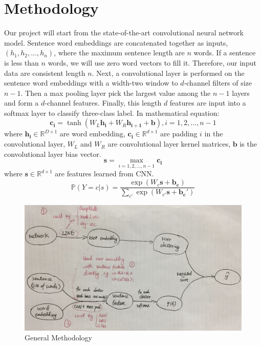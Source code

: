 \newcommand{\R}{\mathbb{R}}
\section{Methodology}
\label{Sec:methodology}


Our project will start from the state-of-the-art convolutional neural network model. Sentence word embeddings are concatenated together as inputs, $(h_1,h_2,\ldots,h_n)$, where the maximum sentence length are $n$ words. If a sentence is less than $n$ words, we will use zero word vectors to fill it. Therefore, our input data are consistent length $n$. Next, a convolutional layer is performed on the sentence word embeddings with a width-two window to $d$-channel filters of size $n-1$. Then a max pooling layer pick the largest value among the $n-1$ layers and form a $d$-channel features. Finally, this length $d$ features are input into a softmax layer to classify three-class label. In mathematical equation:
\begin{equation}
	\mathbf{c_i} = \tanh(W_L\mathbf{h_i} + W_R \mathbf{h_{i+1}} + \mathbf{b}), i=1,2,\ldots,n-1
\end{equation}
where $\mathbf{h_i}\in \R^{D\times1}$ are word embedding, $\mathbf{c_i} \in \R^{d\times1}$ are padding $i$ in the convolutional layer, $W_L$ and $W_R$ are convolutional layer kernel matrices, $\mathbf{b}$ is the convolutional layer bias vector.
\begin{equation}
	\mathbf{s} = \max_{i=1,2,\ldots,n-1}\mathbf{c_i}
\end{equation}
where $\mathbf{s} \in \R^{d \times 1}$ are features learned from CNN.
\begin{equation}
	\mathbb{P}(Y=c|s)=\frac{\exp(W_{c}\mathbf{s}+\mathbf{b_c})}{\sum_{c'}\exp(W_{c'}\mathbf{s}+\mathbf{b_c'})}
\end{equation}


\begin{figure}[htbp] %
   \centering
   \includegraphics[width=5.2in]{flow.jpg} 
   \caption{General Methodology}
   \label{Fig:Flow}
\end{figure}



